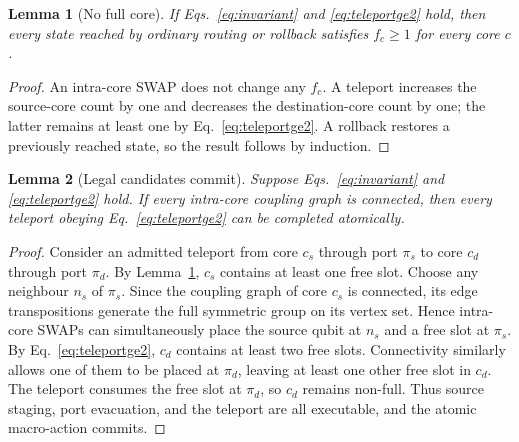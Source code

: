 \documentclass[journal]{IEEEtran}
\newtheorem{lemma}{Lemma}
\begin{document}
\begin{lemma}[No full core]
\label{lem:nofull}
If Eqs.~\eqref{eq:invariant} and \eqref{eq:teleportge2} hold, then every state reached by ordinary routing or rollback satisfies $f_c\geq 1$ for every core $c$. 
\end{lemma}

\begin{proof}

An intra-core SWAP does not change any $f_c$. A teleport increases the source-core count by one and decreases the destination-core count by one; the latter remains at least one by Eq.~\eqref{eq:teleportge2}. A rollback restores a previously reached state, so the result follows by induction. 
\end{proof}

\begin{lemma}[Legal candidates commit] \label{lem:commit} 
Suppose Eqs.~\eqref{eq:invariant} and \eqref{eq:teleportge2} hold. If every intra-core coupling graph is connected, then every teleport obeying Eq.~\eqref{eq:teleportge2} can be completed atomically. 
\end{lemma}
\begin{proof} Consider an admitted teleport from core $c_s$ through port $\pi_s$ to core $c_d$ through port $\pi_d$. By Lemma~\ref{lem:nofull}, $c_s$ contains at least one free slot. Choose any neighbour $n_s$ of $\pi_s$. Since the coupling graph of core $c_s$ is connected, its edge transpositions generate the full symmetric group on its vertex set. Hence intra-core SWAPs can simultaneously place the source qubit at $n_s$ and a free slot at $\pi_s$. By Eq.~\eqref{eq:teleportge2}, $c_d$ contains at least two free slots. Connectivity similarly allows one of them to be placed at $\pi_d$, leaving at least one other free slot in $c_d$. The teleport consumes the free slot at $\pi_d$, so $c_d$ remains non-full. Thus source staging, port evacuation, and the teleport are all executable, and the atomic macro-action commits. 
\end{proof}
\end{document}
